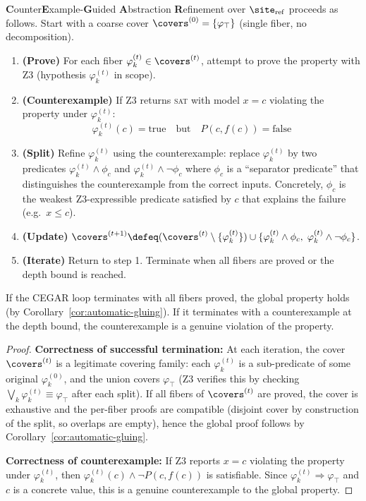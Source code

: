 \begin{definition}
\label{def:cegar-loop}
\textbf{C}ounter\textbf{E}xample-\textbf{G}uided
\textbf{A}bstraction \textbf{R}efinement over $\site_{\mathrm{ref}}$
proceeds as follows.  Start with a coarse cover $\covers^{(0)} =
\{\varphi_\top\}$ (single fiber, no decomposition).
\begin{enumerate}
\item \textbf{(Prove)} For each fiber $\varphi_k^{(t)} \in \covers^{(t)}$,
  attempt to prove the property with Z3 (hypothesis $\varphi_k^{(t)}$
  in scope).
\item \textbf{(Counterexample)} If Z3 returns \textsc{sat} with model
  $x = c$ violating the property under $\varphi_k^{(t)}$:
  \[
    \varphi_k^{(t)}(c) = \mathrm{true}
    \quad\text{but}\quad P(c, f(c)) = \mathrm{false}
  \]
\item \textbf{(Split)} Refine $\varphi_k^{(t)}$ using the counterexample:
  replace $\varphi_k^{(t)}$ by two predicates
  $\varphi_k^{(t)} \wedge \phi_c$ and $\varphi_k^{(t)} \wedge \neg\phi_c$
  where $\phi_c$ is a ``separator predicate'' that distinguishes the
  counterexample from the correct inputs.  Concretely, $\phi_c$ is the
  weakest Z3-expressible predicate satisfied by $c$ that explains the
  failure (e.g.\ $x \le c$).
\item \textbf{(Update)} $\covers^{(t+1)} \defeq (\covers^{(t)} \setminus
  \{\varphi_k^{(t)}\}) \cup \{\varphi_k^{(t)} \wedge \phi_c,\;
  \varphi_k^{(t)} \wedge \neg\phi_c\}$.
\item \textbf{(Iterate)} Return to step 1.  Terminate when all fibers
  are proved or the depth bound is reached.
\end{enumerate}
\end{definition}

\begin{theorem}
\label{thm:cegar-correct}
If the CEGAR loop terminates with all fibers proved, the global property
holds (by Corollary~\ref{cor:automatic-gluing}).  If it terminates with a
counterexample at the depth bound, the counterexample is a genuine
violation of the property.
\end{theorem}

\begin{proof}
\textbf{Correctness of successful termination:} At each iteration, the
cover $\covers^{(t)}$ is a legitimate covering family: each $\varphi_k^{(t)}$
is a sub-predicate of some original $\varphi_k^{(0)}$, and the union covers
$\varphi_\top$ (Z3 verifies this by checking
$\bigvee_k \varphi_k^{(t)} \equiv \varphi_\top$ after each split).
If all fibers of $\covers^{(t)}$ are proved, the cover is exhaustive and
the per-fiber proofs are compatible (disjoint cover by construction of the
split, so overlaps are empty), hence the global proof follows by
Corollary~\ref{cor:automatic-gluing}.

\textbf{Correctness of counterexample:} If Z3 reports $x = c$ violating
the property under $\varphi_k^{(t)}$, then $\varphi_k^{(t)}(c) \wedge
\neg P(c, f(c))$ is satisfiable.  Since $\varphi_k^{(t)} \Rightarrow
\varphi_\top$ and $c$ is a concrete value, this is a genuine counterexample
to the global property.
\end{proof}


